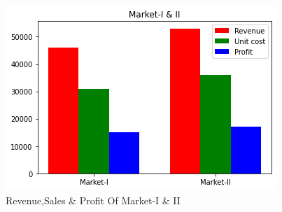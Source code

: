 \documentclass[journal,12pt,twocolumn]{IEEEtran}
\begin{document}
\begin{figure}[!ht]
\centering
\includegraphics[width=\columnwidth]{FIGURE.png}
\caption{Revenue,Sales \& Profit Of Market-I \& II}
\label{fig:Profit}	
\end{figure}
\end{document}
